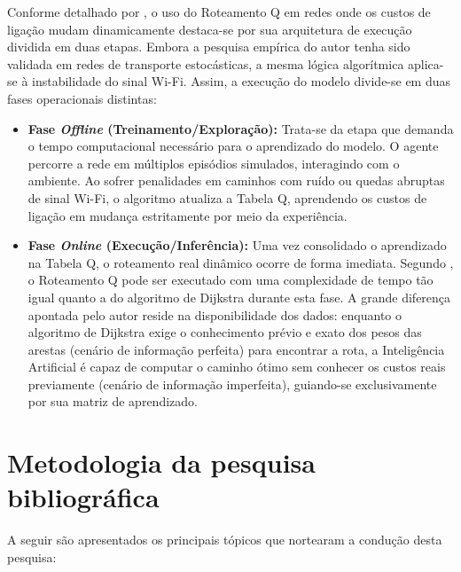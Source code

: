 \documentclass[
    12pt,                %
    openright,           %
    oneside,             %
    a4paper,             %
    english,             %
    brazil               %
]{abntex2}
\begin{document}
Conforme detalhado por , o uso do Roteamento Q em redes onde os custos de ligação mudam dinamicamente destaca-se por sua arquitetura de execução dividida em duas etapas. Embora a pesquisa empírica do autor tenha sido validada em redes de transporte estocásticas, a mesma lógica algorítmica aplica-se à instabilidade do sinal Wi-Fi. Assim, a execução do modelo divide-se em duas fases operacionais distintas:
\begin{itemize}
    \item \textbf{Fase \textit{Offline} (Treinamento/Exploração):} Trata-se da etapa que demanda o tempo computacional necessário para o aprendizado do modelo. O agente percorre a rede em múltiplos episódios simulados, interagindo com o ambiente. Ao sofrer penalidades em caminhos com ruído ou quedas abruptas de sinal Wi-Fi, o algoritmo atualiza a Tabela Q, aprendendo os custos de ligação em mudança estritamente por meio da experiência.
    \item \textbf{Fase \textit{Online} (Execução/Inferência):} Uma vez consolidado o aprendizado na Tabela Q, o roteamento real dinâmico ocorre de forma imediata. Segundo , o Roteamento Q pode ser executado com uma complexidade de tempo tão igual quanto a do algoritmo de Dijkstra durante esta fase. A grande diferença apontada pelo autor reside na disponibilidade dos dados: enquanto o algoritmo de Dijkstra exige o conhecimento prévio e exato dos pesos das arestas (cenário de informação perfeita) para encontrar a rota, a Inteligência Artificial é capaz de computar o caminho ótimo sem conhecer os custos reais previamente (cenário de informação imperfeita), guiando-se exclusivamente por sua matriz de aprendizado.
\end{itemize}

\section{Metodologia da pesquisa bibliográfica}
\label{sec:metodologia_pesquisa}

A seguir são apresentados os principais tópicos que nortearam a condução desta pesquisa:
\end{document}
